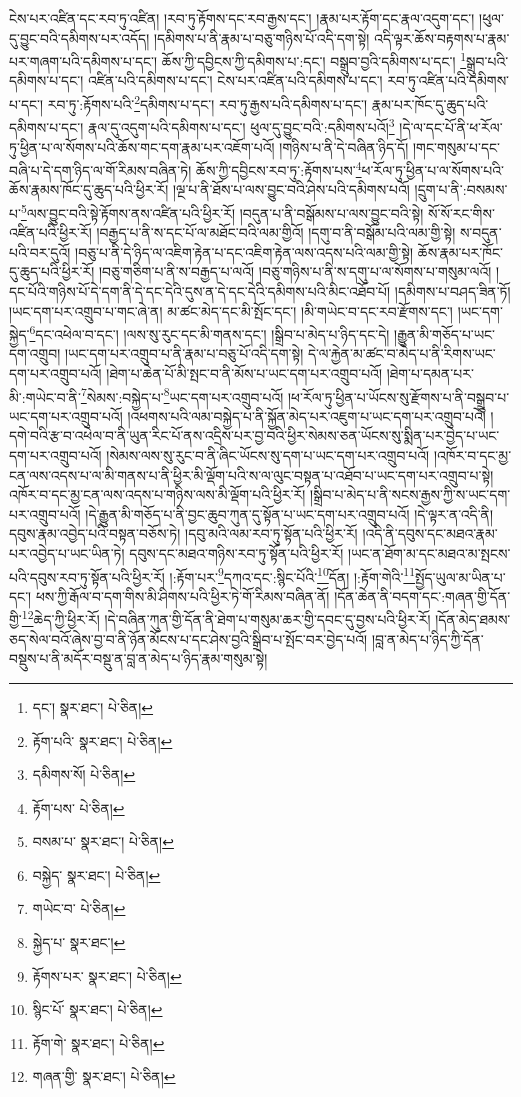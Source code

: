 ངེས་པར་འཛིན་དང་རབ་ཏུ་འཛིན། །རབ་ཏུ་རྟོགས་དང་རབ་རྒྱས་དང་། །རྣམ་པར་རྟོག་དང་རྣལ་འདུག་དང་། །ཕུལ་དུ་བྱུང་བའི་དམིགས་པར་འདོད། །དམིགས་པ་ནི་རྣམ་པ་བཅུ་གཉིས་པོ་འདི་དག་སྟེ། འདི་ལྟར་ཆོས་བརྟགས་པ་རྣམ་པར་གཞག་པའི་དམིགས་པ་དང་། ཆོས་ཀྱི་དབྱིངས་ཀྱི་དམིགས་པ་:དང་། བསྒྲུབ་བྱའི་དམིགས་པ་དང་། \footnote{དང་།    སྣར་ཐང་།  པེ་ཅིན། }སྒྲུབ་པའི་དམིགས་པ་དང་། འཛིན་པའི་དམིགས་པ་དང་། ངེས་པར་འཛིན་པའི་དམིགས་པ་དང་། རབ་ཏུ་འཛིན་པའི་དམིགས་པ་དང་། རབ་ཏུ་:རྟོགས་པའི་\footnote{རྟོག་པའི་  སྣར་ཐང་།  པེ་ཅིན། }དམིགས་པ་དང་། རབ་ཏུ་རྒྱས་པའི་དམིགས་པ་དང་། རྣམ་པར་ཁོང་དུ་ཆུད་པའི་དམིགས་པ་དང་། རྣལ་དུ་འདུག་པའི་དམིགས་པ་དང་། ཕུལ་དུ་བྱུང་བའི་:དམིགས་པའོ།\footnote{དམིགས་སོ།  པེ་ཅིན། } །དེ་ལ་དང་པོ་ནི་ཕ་རོལ་ཏུ་ཕྱིན་པ་ལ་སོགས་པའི་ཆོས་གང་དག་རྣམ་པར་འཇོག་པའོ། །གཉིས་པ་ནི་དེ་བཞིན་ཉིད་དོ། །གང་གསུམ་པ་དང་བཞི་པ་དེ་དག་ཉིད་ལ་གོ་རིམས་བཞིན་ཏེ། ཆོས་ཀྱི་དབྱིངས་རབ་ཏུ་:རྟོགས་པས་\footnote{རྟོག་པས་  པེ་ཅིན། }ཕ་རོལ་ཏུ་ཕྱིན་པ་ལ་སོགས་པའི་ཆོས་རྣམས་ཁོང་དུ་ཆུད་པའི་ཕྱིར་རོ། །ལྔ་པ་ནི་ཐོས་པ་ལས་བྱུང་བའི་ཤེས་པའི་དམིགས་པའོ། །དྲུག་པ་ནི་:བསམས་པ་\footnote{བསམ་པ་  སྣར་ཐང་།  པེ་ཅིན། }ལས་བྱུང་བའི་སྟེ་རྟོགས་ནས་འཛིན་པའི་ཕྱིར་རོ། །བདུན་པ་ནི་བསྒོམས་པ་ལས་བྱུང་བའི་སྟེ། སོ་སོ་རང་གིས་འཛིན་པའི་ཕྱིར་རོ། །བརྒྱད་པ་ནི་ས་དང་པོ་ལ་མཐོང་བའི་ལམ་གྱིའོ། །དགུ་བ་ནི་བསྒོམ་པའི་ལམ་གྱི་སྟེ། ས་བདུན་པའི་བར་དུའོ། །བཅུ་པ་ནི་དེ་ཉིད་ལ་འཇིག་རྟེན་པ་དང་འཇིག་རྟེན་ལས་འདས་པའི་ལམ་གྱི་སྟེ། ཆོས་རྣམ་པར་ཁོང་དུ་ཆུད་པའི་ཕྱིར་རོ། །བཅུ་གཅིག་པ་ནི་ས་བརྒྱད་པ་ལའོ། །བཅུ་གཉིས་པ་ནི་ས་དགུ་པ་ལ་སོགས་པ་གསུམ་ལའོ། །དང་པོའི་གཉིས་པོ་དེ་དག་ནི་དེ་དང་དེའི་དུས་ན་དེ་དང་དེའི་དམིགས་པའི་མིང་འཐོབ་པོ། །དམིགས་པ་བཤད་ཟིན་ཏོ། །ཡང་དག་པར་འགྲུབ་པ་གང་ཞེ་ན། མ་ཚང་མེད་དང་མི་སྤོང་དང་། །མི་གཡེང་བ་དང་རབ་རྫོགས་དང་། །ཡང་དག་སྐྱེད་\footnote{བསྐྱེད་  སྣར་ཐང་།  པེ་ཅིན། }དང་འཕེལ་བ་དང་། །ལས་སུ་རུང་དང་མི་གནས་དང་། །སྒྲིབ་པ་མེད་པ་ཉིད་དང་དེ། །རྒྱུན་མི་གཅོད་པ་ཡང་དག་འགྲུབ། །ཡང་དག་པར་འགྲུབ་པ་ནི་རྣམ་པ་བཅུ་པོ་འདི་དག་སྟེ། དེ་ལ་རྐྱེན་མ་ཚང་བ་མེད་པ་ནི་རིགས་ཡང་དག་པར་འགྲུབ་པའོ། །ཐེག་པ་ཆེན་པོ་མི་སྤང་བ་ནི་མོས་པ་ཡང་དག་པར་འགྲུབ་པའོ། །ཐེག་པ་དམན་པར་མི་:གཡེང་བ་ནི་\footnote{གཡེང་བ་  པེ་ཅིན། }སེམས་:བསྐྱེད་པ་\footnote{སྐྱེད་པ་  སྣར་ཐང་། }ཡང་དག་པར་འགྲུབ་པའོ། །ཕ་རོལ་ཏུ་ཕྱིན་པ་ཡོངས་སུ་རྫོགས་པ་ནི་བསྒྲུབ་པ་ཡང་དག་པར་འགྲུབ་པའོ། །འཕགས་པའི་ལམ་བསྐྱེད་པ་ནི་སྐྱོན་མེད་པར་འཇུག་པ་ཡང་དག་པར་འགྲུབ་པའོ། །དགེ་བའི་རྩ་བ་འཕེལ་བ་ནི་ཡུན་རིང་པོ་ནས་འདྲིས་པར་བྱ་བའི་ཕྱིར་སེམས་ཅན་ཡོངས་སུ་སྨིན་པར་བྱེད་པ་ཡང་དག་པར་འགྲུབ་པའོ། །སེམས་ལས་སུ་རུང་བ་ནི་ཞིང་ཡོངས་སུ་དག་པ་ཡང་དག་པར་འགྲུབ་པའོ། །འཁོར་བ་དང་མྱ་ངན་ལས་འདས་པ་ལ་མི་གནས་པ་ནི་ཕྱིར་མི་ལྡོག་པའི་ས་ལ་ལུང་བསྟན་པ་འཐོབ་པ་ཡང་དག་པར་འགྲུབ་པ་སྟེ། འཁོར་བ་དང་མྱ་ངན་ལས་འདས་པ་གཉིས་ལས་མི་ལྡོག་པའི་ཕྱིར་རོ། །སྒྲིབ་པ་མེད་པ་ནི་སངས་རྒྱས་ཀྱི་ས་ཡང་དག་པར་འགྲུབ་པའོ། །དེ་རྒྱུན་མི་གཅོད་པ་ནི་བྱང་ཆུབ་ཀུན་དུ་སྟོན་པ་ཡང་དག་པར་འགྲུབ་པའོ། །དེ་ལྟར་ན་འདི་ནི། དབུས་རྣམ་འབྱེད་པའི་བསྟན་བཅོས་ཏེ། །དབུ་མའི་ལམ་རབ་ཏུ་སྟོན་པའི་ཕྱིར་རོ། །འདི་ནི་དབུས་དང་མཐའ་རྣམ་པར་འབྱེད་པ་ཡང་ཡིན་ཏེ། དབུས་དང་མཐའ་གཉིས་རབ་ཏུ་སྟོན་པའི་ཕྱིར་རོ། །ཡང་ན་ཐོག་མ་དང་མཐའ་མ་སྤངས་པའི་དབུས་རབ་ཏུ་སྟོན་པའི་ཕྱིར་རོ། །:རྟོག་པར་\footnote{རྟོགས་པར་  སྣར་ཐང་།  པེ་ཅིན། }དཀའ་དང་:སྙིང་པོའི་\footnote{སྙིང་པོ་  སྣར་ཐང་།  པེ་ཅིན། }དོན། །:རྟོག་གེའི་\footnote{རྟོག་གེ་  སྣར་ཐང་།  པེ་ཅིན། }སྤྱོད་ཡུལ་མ་ཡིན་པ་དང་། ཕས་ཀྱི་རྒོལ་བ་དག་གིས་མི་ཤིགས་པའི་ཕྱིར་ཏེ་གོ་རིམས་བཞིན་ནོ། །དོན་ཆེན་ནི་བདག་དང་:གཞན་གྱི་དོན་གྱི་\footnote{གཞན་གྱི་  སྣར་ཐང་།  པེ་ཅིན། }ཆེད་ཀྱི་ཕྱིར་རོ། །དེ་བཞིན་ཀུན་གྱི་དོན་ནི་ཐེག་པ་གསུམ་ཆར་གྱི་དབང་དུ་བྱས་པའི་ཕྱིར་རོ། །དོན་མེད་ཐམས་ཅད་སེལ་བའོ་ཞེས་བྱ་བ་ནི་ཉོན་མོངས་པ་དང་ཤེས་བྱའི་སྒྲིབ་པ་སྤོང་བར་བྱེད་པའོ། །བླ་ན་མེད་པ་ཉིད་ཀྱི་དོན་བསྡུས་པ་ནི་མདོར་བསྡུ་ན་བླ་ན་མེད་པ་ཉིད་རྣམ་གསུམ་སྟེ། 